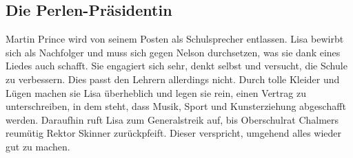 

\subsection{Die Perlen-Präsidentin}\label{EABF20}
Martin Prince wird von seinem Posten als Schulsprecher entlassen. Lisa bewirbt sich als Nachfolger und muss sich gegen Nelson durchsetzen, was sie dank eines Liedes auch schafft. Sie engagiert sich sehr, denkt selbst und versucht, die Schule zu verbessern. Dies passt den Lehrern allerdings nicht. Durch tolle Kleider und Lügen machen sie Lisa überheblich und legen sie rein, einen Vertrag zu unterschreiben, in dem steht, dass Musik, Sport und Kunsterziehung abgeschafft werden. Daraufhin ruft Lisa zum Generalstreik auf, bis Oberschulrat Chalmers reumütig Rektor Skinner zurückpfeift. Dieser verspricht, umgehend alles wieder gut zu machen.


